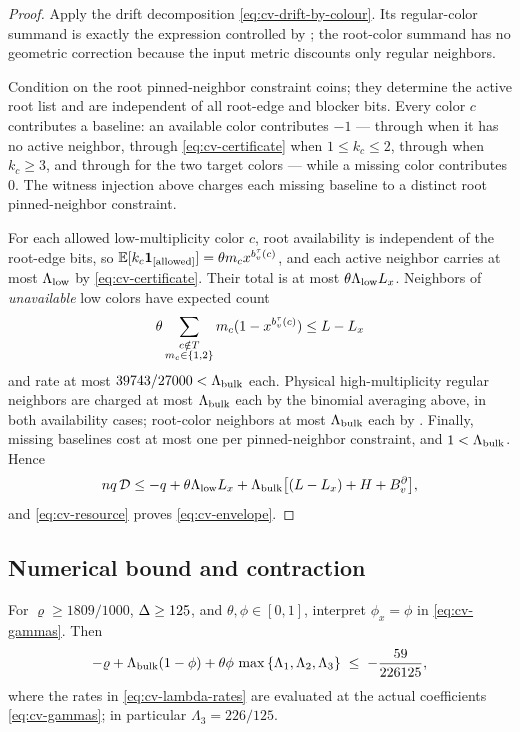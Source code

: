 \begin{proof}
Apply the drift decomposition \eqref{eq:cv-drift-by-colour}.  Its regular-color
summand is exactly the expression controlled by
; the root-color summand has no
geometric correction because the input metric discounts only regular
neighbors.

Condition on the root pinned-neighbor constraint coins; they determine the active
root list and are independent of all root-edge and blocker bits.
Every color \(c\) contributes a baseline: an available color contributes $-1$
--- through  when
it has no active neighbor, through \eqref{eq:cv-certificate}
when $1\le k_c\le2$, through  when $k_c\ge3$, and
through  for the two target colors --- while a
missing color contributes $0$.  The witness injection above charges each
missing baseline to a distinct root pinned-neighbor constraint.

For each allowed low-multiplicity color \(c\), root availability is independent of
the root-edge bits, so
$\operatorname{\mathbb{E}}[k_c\mathbf{1}_{\left[\text{allowed}\right]}]=\theta m_cx^{b_v^\tau(c)}$, and each active
neighbor carries at most $\Lambda_{\rm low}$ by
\eqref{eq:cv-certificate}.  Their total is at most
$\theta\Lambda_{\rm low}L_x$. Neighbors of \emph{unavailable} low colors have expected
count
\[
 \theta\sum_{\substack{c\notin T\\m_c\in\left\{1,2\right\}}}
      m_c(1-x^{b_v^\tau(c)})\le L-L_x
\]
and rate at
most $39743/27000<\Lambda_{\rm bulk}$ each.  Physical
high-multiplicity regular neighbors are charged at most
$\Lambda_{\rm bulk}$ each by the binomial averaging above, in both
availability cases; root-color neighbors at most $\Lambda_{\rm bulk}$
each by .  Finally, missing baselines cost at most one
per pinned-neighbor constraint, and $1<\Lambda_{\rm bulk}$. Hence
\[
  nq\,\mathcal D\le-q+\theta\Lambda_{\rm low}L_x
    +\Lambda_{\rm bulk}\bigl[(L-L_x)+H+B_v^{\partial}\bigr],
\]
and \eqref{eq:cv-resource} proves \eqref{eq:cv-envelope}.
\end{proof}

\subsection{Numerical bound and contraction}
\begin{lemma}\label{lem:cv-scalar}
For $\varrho\ge1809/1000$, $\Delta\ge125$, and
$\theta,\phi\in[0,1]$, interpret $\phi_x=\phi$ in
\eqref{eq:cv-gammas}. Then
\[
  -\varrho+\Lambda_{\rm bulk}(1-\phi)
    +\theta\phi\,\max\left\{\Lambda_1,\Lambda_2,\Lambda_3\right\}
  \;\le\;-\frac{59}{226125},
\]
where the rates in \eqref{eq:cv-lambda-rates} are evaluated at the actual
coefficients \eqref{eq:cv-gammas}; in particular
\(\Lambda_3=226/125\).
\end{lemma}

